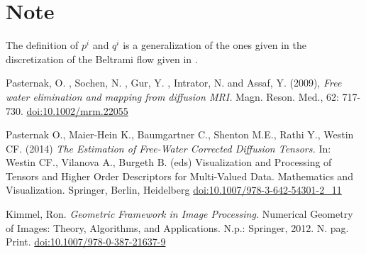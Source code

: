 \documentclass[12pt]{article}
\begin{document}
\section{Note}
The definition of $p^i$ and $q^i$ is a generalization of the ones given in the
discretization of the Beltrami flow given in \cite{Kimmel}.

\begin{thebibliography}{9}
         Pasternak, O. , Sochen, N. ,
                Gur, Y. , Intrator, N. and Assaf, Y. (2009), \textit{Free water
                elimination and mapping from diffusion MRI.} Magn. Reson.
                Med., 62: 717-730.
                \href{https://doi.org/10.1002/mrm.22055}{doi:10.1002/mrm.22055}

         Pasternak O., Maier-Hein K.,
                Baumgartner C., Shenton M.E., Rathi Y., Westin CF.  (2014)
                \textit{The Estimation of Free-Water Corrected Diffusion
                Tensors.} In: Westin CF., Vilanova A., Burgeth B. (eds)
                Visualization and Processing of Tensors and Higher Order
                Descriptors for Multi-Valued Data. Mathematics and
                Visualization.  Springer, Berlin, Heidelberg
                \href{https://doi.org/10.1007/978-3-642-54301-2\_11}{doi:10.1007/978-3-642-54301-2\_11}

         Kimmel, Ron. \textit{Geometric Framework in
                Image Processing.} Numerical Geometry of Images: Theory,
                Algorithms, and Applications. N.p.: Springer, 2012. N. pag.
                Print.
                \href{https://doi.org/10.1007/978-0-387-21637-9}{doi:10.1007/978-0-387-21637-9}

\end{thebibliography}
\end{document}

